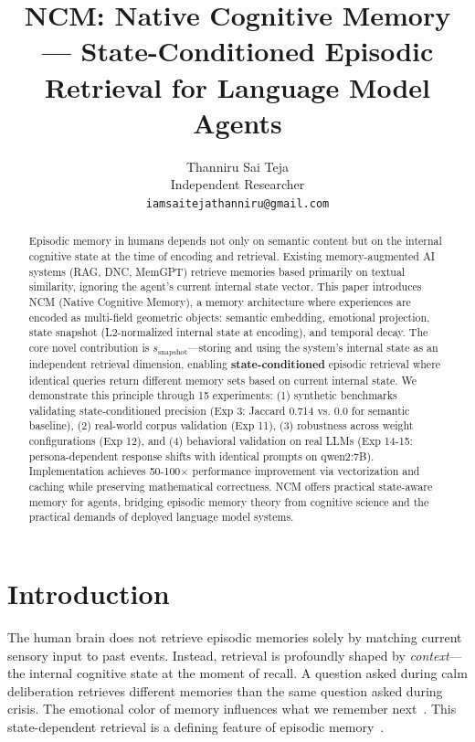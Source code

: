 \documentclass[10pt,twocolumn,letterpaper]{article}
\begin{document}
\title{NCM: Native Cognitive Memory --- State-Conditioned Episodic Retrieval for Language Model Agents}

\author{Thanniru Sai Teja\\
Independent Researcher\\
{\tt \small iamsaitejathanniru@gmail.com}}

\maketitle

\begin{abstract}
Episodic memory in humans depends not only on semantic content but on the internal cognitive state at the time of encoding and retrieval. Existing memory-augmented AI systems (RAG, DNC, MemGPT) retrieve memories based primarily on textual similarity, ignoring the agent's current internal state vector. This paper introduces NCM (Native Cognitive Memory), a memory architecture where experiences are encoded as multi-field geometric objects: semantic embedding, emotional projection, state snapshot (L2-normalized internal state at encoding), and temporal decay. The core novel contribution is \textbf{$s_{\text{snapshot}}$}---storing and using the system's internal state as an independent retrieval dimension, enabling \textbf{state-conditioned} episodic retrieval where identical queries return different memory sets based on current internal state. We demonstrate this principle through 15 experiments: (1) synthetic benchmarks validating state-conditioned precision (Exp 3: Jaccard 0.714 vs. 0.0 for semantic baseline), (2) real-world corpus validation (Exp 11), (3) robustness across weight configurations (Exp 12), and (4) behavioral validation on real LLMs (Exp 14-15: persona-dependent response shifts with identical prompts on qwen2:7B). Implementation achieves 50-100$\times$ performance improvement via vectorization and caching while preserving mathematical correctness. NCM offers practical state-aware memory for agents, bridging episodic memory theory from cognitive science and the practical demands of deployed language model systems.
\end{abstract}

\section{Introduction}

The human brain does not retrieve episodic memories solely by matching current sensory input to past events. Instead, retrieval is profoundly shaped by \textit{context}---the internal cognitive state at the moment of recall. A question asked during calm deliberation retrieves different memories than the same question asked during crisis. The emotional color of memory influences what we remember next~\cite{McGaugh2000}. This state-dependent retrieval is a defining feature of episodic memory~\cite{Tulving1972}.
\end{document}
